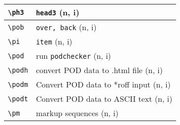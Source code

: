 \documentclass[oneside,10pt,landscape,DIV17]{scrartcl}
\begin{document}
\begin{multicols}{3}
\begin{center}
\begin{tabular}[]{|p{11mm}|p{60mm}|}
\hline \verb'\ph3'    & \verb'head3'                    \hfill (n, i)\\
\hline \verb'\pob'    & \verb'over, back'               \hfill (n, i)\\
\hline \verb'\pi'     & \verb'item'                     \hfill (n, i)\\
\hline \verb'\pod'    & run \verb'podchecker'           \hfill (n, i)\\
\hline \verb'\podh'   & convert POD data to .html file  \hfill (n, i)\\
\hline \verb'\podm'   & Convert POD data to *roff input \hfill (n, i)\\
\hline \verb'\podt'   & Convert POD data to ASCII text  \hfill (n, i)\\
\hline \verb'\pm'     & markup sequences                \hfill (n, i)\\
\hline
\end{tabular}\\
%
%
\end{center}%
\end{multicols}%
%
\newpage
%
%
\end{document}
